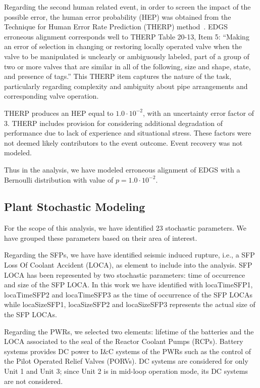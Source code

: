 Regarding the second human related event, in order to screen the impact of the possible error, 
the human error probability 
(HEP) was obtained from the Technique for Human Error Rate Prediction (THERP) 
method~\cite{NUREGCR1278}. 
EDGS erroneous alignment corresponds well to THERP Table 20-13, Item 5: ``Making an error 
of selection in changing or restoring locally operated valve when the valve to be manipulated 
is unclearly or ambiguously labeled, part of a group of two or more valves that are similar in 
all of the following, size and shape, state, and presence of tags.'' This THERP item captures 
the nature of the task, particularly regarding complexity and ambiguity about pipe arrangements 
and corresponding valve operation. 

THERP produces an HEP equal to $1.0 \cdot 10^{-2}$, with an uncertainty 
error factor of 3. THERP includes provision for considering additional degradation of performance 
due to lack of experience and situational stress. These factors were not deemed likely contributors 
to the event outcome. Event recovery was not modeled.

Thus in the analysis, we have modeled erroneous alignment of EDGS with a Bernoulli 
distribution with value of $p=1.0 \cdot 10^{-2}$.

\subsection{Plant Stochastic Modeling}
\label{sec:plantStochasticModeling}
For the scope of this analysis, we have identified 23 stochastic parameters. We have 
grouped these parameters based on their area of interest.

Regarding the SFPs, we have have identified seismic induced rupture, i.e., a SFP Loss Of
Coolant Accident (LOCA), as 
element to include into the analysis. SFP LOCA has been represented by two stochastic 
parameters: time of occurrence and size of the SFP LOCA. In this work we have identified 
with locaTimeSFP1, locaTimeSFP2 and locaTimeSFP3 as the time of occurrence of the SFP 
LOCAs while locaSizeSFP1, locaSizeSFP2 and locaSizeSFP3 represents the actual size of 
the SFP LOCAs.

Regarding the PWRs, we selected two elements: lifetime of the batteries and the LOCA 
associated to the seal of the Reactor Coolant Pumps (RCPs). Battery systems provides 
DC power to I\&C systems 
of the PWRs such as the control of the Pilot Operated Relief Valves (PORVs).
DC systems are considered for only 
Unit 1 and Unit 3; since Unit 2 is in mid-loop operation mode, its DC systems are not 
considered.

